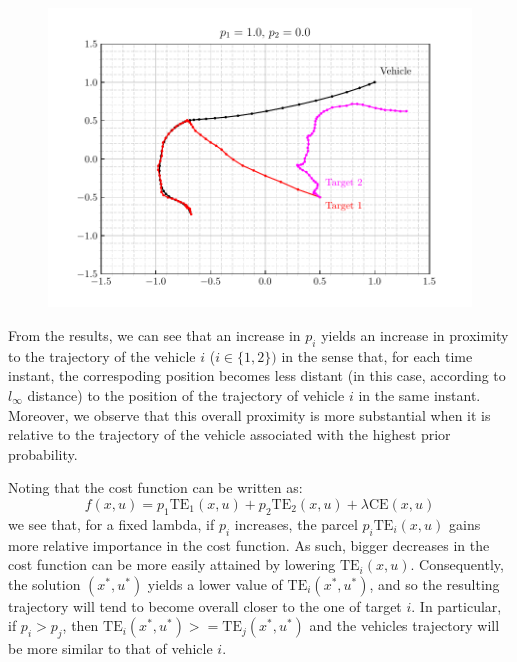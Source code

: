 \documentclass[12pt]{article}
\begin{document}
\begin{figure}[H]
    \centering
    \includegraphics{../../src/task_4/output/ex_4_i=6.pdf}
\end{figure}

From the results, we can see that an increase in $p_i$ yields an increase in proximity to the trajectory of the vehicle $i$ ($i \in \{1, 2\})$ in the sense that, for each time instant, the correspoding position becomes less distant (in this case, according to $l_{\infty}$ distance) to the position of the trajectory of vehicle $i$ in the same instant. Moreover, we observe that this overall proximity is more substantial when it is relative to the trajectory of the vehicle associated with the highest prior probability.

Noting that the cost function can be written as:
\[
    f(x, u) = p_1 \text{TE}_1(x, u) + p_2 \text{TE}_2(x, u) + \lambda \text{CE}(x, u)
\]
we see that, for a fixed lambda, if $p_i$ increases, the parcel $p_i \text{TE}_i(x, u)$ gains more relative importance in the cost function. As such, bigger decreases in the cost function can be more easily attained by lowering $\text{TE}_i(x, u)$. Consequently, the solution $(x^*, u^*)$ yields a lower value of $\text{TE}_i(x^*, u^*)$, and so the resulting trajectory will tend to become overall closer to the one of target $i$. In particular, if $p_i > p_j$, then  $\text{TE}_i(x^*, u^*) >=\text{TE}_j(x^*, u^*)$ and the vehicles trajectory will be more similar to that of vehicle $i$.
\end{document}

